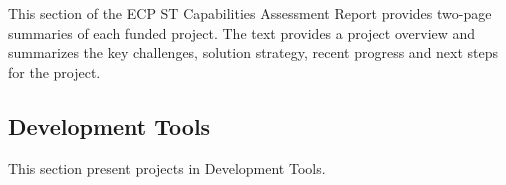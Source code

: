 \documentclass{ecpreport-publicv1}
\newcommand{\pmr}{Programming Models \& Runtimes}
\newcommand{\tools}{Development Tools}
\begin{document}
This section of the ECP ST Capabilities Assessment Report provides two-page summaries of each funded project.  The text provides a project overview and summarizes the key challenges, solution strategy, recent progress and next steps for the project.
\newpage
%
%
%
%
%
%
%
%
%
%


\subsection{\tools}
This section present projects in \tools.
\newpage

\newpage

\newpage

\newpage





\newpage



\newpage

\newpage
\end{document}
